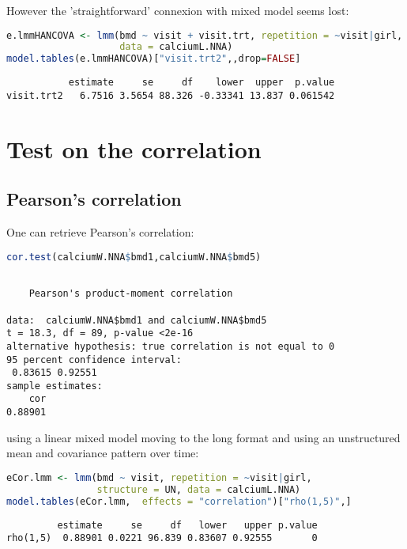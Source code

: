 \documentclass[12pt]{article}
\begin{document}
However the 'straightforward' connexion with mixed model seems lost:
\begin{lstlisting}[language=r,numbers=none]
e.lmmHANCOVA <- lmm(bmd ~ visit + visit.trt, repetition = ~visit|girl, structure = UN(~grp),
                    data = calciumL.NNA)
model.tables(e.lmmHANCOVA)["visit.trt2",,drop=FALSE]
\end{lstlisting}

\label{}
\begin{verbatim}
           estimate     se     df    lower  upper  p.value
visit.trt2   6.7516 3.5654 88.326 -0.33341 13.837 0.061542
\end{verbatim}


\clearpage
\section{Test on the correlation}
\label{sec:orgfc10cbf}

\subsection{Pearson's correlation}
\label{sec:org9ebcf6f}

One can retrieve Pearson's correlation:
\begin{lstlisting}[language=r,numbers=none]
cor.test(calciumW.NNA$bmd1,calciumW.NNA$bmd5)
\end{lstlisting}

\label{}
\begin{verbatim}

	Pearson's product-moment correlation

data:  calciumW.NNA$bmd1 and calciumW.NNA$bmd5
t = 18.3, df = 89, p-value <2e-16
alternative hypothesis: true correlation is not equal to 0
95 percent confidence interval:
 0.83615 0.92551
sample estimates:
    cor 
0.88901
\end{verbatim}

using a linear mixed model moving to the long format and using an
unstructured mean and covariance pattern over time:
\begin{lstlisting}[language=r,numbers=none]
eCor.lmm <- lmm(bmd ~ visit, repetition = ~visit|girl,
                structure = UN, data = calciumL.NNA)
model.tables(eCor.lmm,  effects = "correlation")["rho(1,5)",]
\end{lstlisting}

\label{}
\begin{verbatim}
         estimate     se     df   lower   upper p.value
rho(1,5)  0.88901 0.0221 96.839 0.83607 0.92555       0
\end{verbatim}
\end{document}
